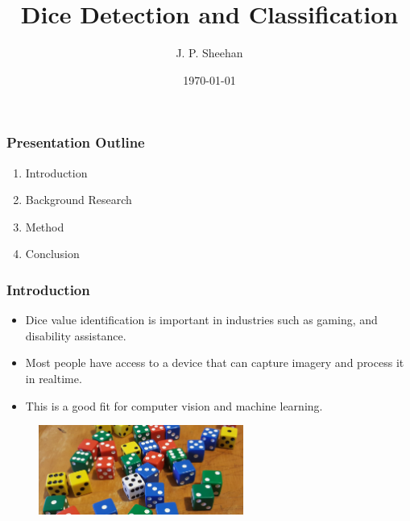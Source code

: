\documentclass{beamer}
\title{Dice Detection and Classification}
\author{J. P. Sheehan}
\institute{University of Canterbury}
\date{\today}
\begin{document}
\frame{\titlepage}


\begin{frame}
\frametitle{Presentation Outline}

\begin{enumerate}
	\item Introduction
	\item Background Research
	\item Method
	\item Conclusion
\end{enumerate}

\end{frame}




\begin{frame}
\frametitle{Introduction}

\begin{itemize}
	\item Dice value identification is important in industries such as gaming, and disability assistance.
	\item Most people have access to a device that can capture imagery and process it in realtime.
	\item This is a good fit for computer vision and machine learning.
\end{itemize}

\vspace{\baselineskip}

\begin{figure}
	\centering
	\includegraphics[width=0.6\textwidth]{intro}
\end{figure}
	
\end{frame}



\end{document}
